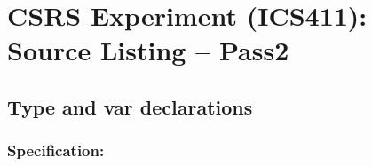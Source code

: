 \chapter {CSRS Experiment (ICS411): Source Listing -- Pass2}
\small
	  

\section{Type and var declarations}
\subsection*{Specification:}

